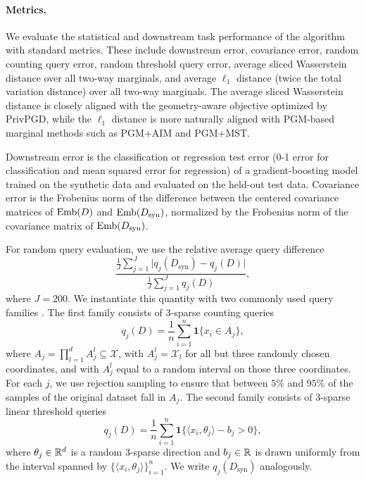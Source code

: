 \paragraph{Metrics.}
We evaluate the statistical and downstream task performance of the algorithm with standard metrics. These include downstream error, covariance error, random counting query error, random threshold query error, average sliced Wasserstein distance over all two-way marginals, and average \(\ell_1\) distance (twice the total variation distance) over all two-way marginals. The average sliced Wasserstein distance is closely aligned with the geometry-aware objective optimized by PrivPGD, while the \(\ell_1\) distance is more naturally aligned with PGM-based marginal methods such as PGM+AIM and PGM+MST.

Downstream error is the classification or regression test error (0-1 error for classification and mean squared error for regression) of a gradient-boosting model trained on the synthetic data and evaluated on the held-out test data. Covariance error is the Frobenius norm of the difference between the centered covariance matrices of \(\operatorname{Emb}(D)\) and \(\operatorname{Emb}(D_{\mathrm{syn}})\), normalized by the Frobenius norm of the covariance matrix of \(\operatorname{Emb}(D_{\mathrm{syn}})\).

For random query evaluation, we use the relative average query difference
\begin{equation}
\label{eq:privpgd-query-diff}
  \frac{\frac{1}{J}\sum_{j=1}^J \lvert q_j(D_{\mathrm{syn}})-q_j(D)\rvert}
       {\frac{1}{J}\sum_{j=1}^J q_j(D)},
\end{equation}
where \(J=200\). We instantiate this quantity with two commonly used query families \citep{vietri2022private}. The first family consists of \(3\)-sparse counting queries
\[
  q_j(D)
  =
  \frac{1}{n}\sum_{i=1}^n \mathbf{1}\{x_i \in A_j\},
\]
where \(A_j = \prod_{l=1}^d A_j^l \subseteq \mathcal{X}\), with \(A_j^l = \mathcal{X}_l\) for all but three randomly chosen coordinates, and with \(A_j^l\) equal to a random interval on those three coordinates. For each \(j\), we use rejection sampling to ensure that between \(5\%\) and \(95\%\) of the samples of the original dataset fall in \(A_j\). The second family consists of \(3\)-sparse linear threshold queries
\[
  q_j(D)
  =
  \frac{1}{n}\sum_{i=1}^n \mathbf{1}\{\langle x_i,\theta_j\rangle - b_j > 0\},
\]
where \(\theta_j \in \mathbb{R}^d\) is a random \(3\)-sparse direction and \(b_j \in \mathbb{R}\) is drawn uniformly from the interval spanned by \(\{\langle x_i,\theta_j\rangle\}_{i=1}^n\). We write \(q_j(D_{\mathrm{syn}})\) analogously.

